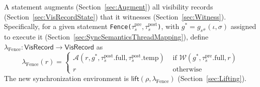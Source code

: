 

A  statement augments (Section~\ref{sec:Augment}) all visibility records (Section~\ref{sec:VisRecordState}) that it witnesses (Section~\ref{sec:Witness}).
Specifically, for a given statement \texttt{Fence($\tau_s^\mathrm{pre}, \tau_s^\mathrm{post}$)}, with $g^* = g_{s^\#}(\iota, \sigma)$ assigned to execute it (Section~\ref{sec:SyncSemanticsThreadMapping}), define $\lambda_\mathrm{Fence}: \mathsf{VisRecord} \to \mathsf{VisRecord}$ as
\begin{equation*}
    \lambda_\mathrm{Fence}(r) = \begin{cases}
        \mathcal{A}(r, g^*, \tau_s^\mathrm{post}.\mathrm{full}, \tau_s^\mathrm{post}.\mathrm{temp}) & \text{ if } \mathcal{W}(g^*, \tau_s^\mathrm{pre}.\mathrm{full}, r) \\
        r & \text{ otherwise }
    \end{cases}
\end{equation*}
The new synchronization environment is $\mathsf{lift}(\rho, \lambda_\mathrm{Fence})$ (Section~\ref{sec:Lifting}).

